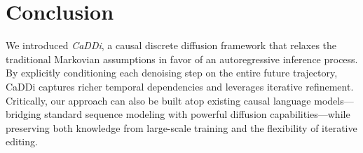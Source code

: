 \section{Conclusion}
We introduced \emph{CaDDi}, a causal discrete diffusion framework that relaxes the traditional Markovian assumptions in favor of an autoregressive inference process. By explicitly conditioning each denoising step on the entire future trajectory, CaDDi captures richer temporal dependencies and leverages iterative refinement. Critically, our approach can also be built atop existing causal language models---bridging standard sequence modeling with powerful diffusion capabilities---while preserving both knowledge from large-scale training and the flexibility of iterative editing.

